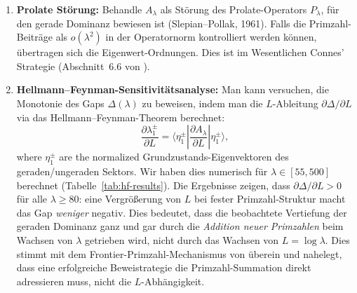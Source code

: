﻿\documentclass[12pt,a4paper]{article}
\theoremstyle{definition}
\theoremstyle{remark}
\begin{document}
\begin{enumerate}[label=(\Alph*)]
  Diese Abwesenheit hat strukturelle Bedeutung: die Matrizen $D_N(r)$ haben bei verschiedenen $r$ fundamental verschiedene Eigenbasen, und keine feste Basis diagonalisiert sie gleichzeitig. Die Primzahl-Shifts auf verschiedenen Skalen tragen keine gemeinsame verborgene Symmetrie. Dies steht im Einklang mit der multiplikativen Unabhängigkeit der Primzahlen: sie haben keine gemeinsame algebraische Struktur, die ein einzelner Operator erfassen könnte. Gerade Dominanz kann daher nicht aus einem Sturm--Liouville-artigen Oszillationsprinzip folgen. Sie muss aus dem punktweisen Shift-Parity-Lemma, summiert mit Primzahl-Gewichten, entstehen---genau dem Frontier-Dominanz-Mechanismus.

  \item \textbf{Prolate Störung:} Behandle $A_\lambda$ als Störung des Prolate-Operators $P_\lambda$, für den gerade Dominanz bewiesen ist (Slepian--Pollak, 1961). Falls die Primzahl-Beiträge als $o(\lambda^2)$ in der Operatornorm kontrolliert werden können, übertragen sich die Eigenwert-Ordnungen. Dies ist im Wesentlichen Connes' Strategie (Abschnitt~6.6 von \cite{Connes2026}).

  \item \textbf{Hellmann--Feynman-Sensitivitätsanalyse:} Man kann versuchen, die Monotonie des Gaps $\Delta(\lambda)$ zu beweisen, indem man die $L$-Ableitung $\partial\Delta/\partial L$ via das Hellmann--Feynman-Theorem berechnet:
  \[ \frac{\partial \lambda_1^\pm}{\partial L} = \langle \eta_1^\pm | \frac{\partial A_\lambda}{\partial L} | \eta_1^\pm \rangle, \]
  where $\eta_1^\pm$ are the normalized Grundzustands-Eigenvektoren des geraden/ungeraden Sektors.
  Wir haben dies numerisch für $\lambda \in [55, 500]$ berechnet (Tabelle~\ref{tab:hf-results}). Die Ergebnisse zeigen, dass $\partial\Delta/\partial L > 0$ für alle $\lambda \geq 80$: eine Vergrößerung von $L$ bei fester Primzahl-Struktur macht das Gap \emph{weniger} negativ. Dies bedeutet, dass die beobachtete Vertiefung der geraden Dominanz ganz und gar durch die \emph{Addition neuer Primzahlen} beim Wachsen von $\lambda$ getrieben wird, nicht durch das Wachsen von $L = \log\lambda$. Dies stimmt mit dem Frontier-Primzahl-Mechanismus von  überein und nahelegt, dass eine erfolgreiche Beweistrategie die Primzahl-Summation direkt adressieren muss, nicht die $L$-Abhängigkeit.
\end{enumerate}
\end{document}
